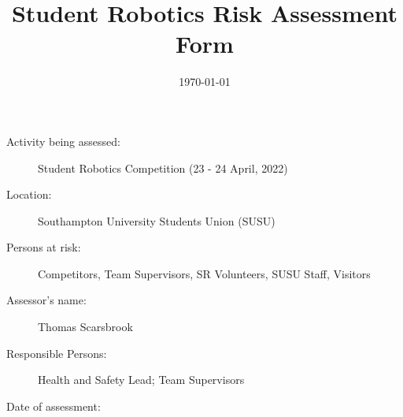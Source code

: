 \documentclass[12pt,a4paper]{scrartcl}
\title{Student Robotics Risk Assessment Form}
\begin{document}
\maketitle

\begin{description}
\item[Activity being assessed:] Student Robotics Competition (23 - 24 April, 2022)
\item[Location:] Southampton University Students Union (SUSU)
\item[Persons at risk:] Competitors, Team Supervisors, SR Volunteers, SUSU Staff, Visitors
\end{description}

\begin{description}
\item[Assessor's name:] Thomas Scarsbrook
\item[Responsible Persons:] Health and Safety Lead; Team Supervisors
\item[Date of assessment:] \date{\today}
\end{description}
\clearpage

\newcommand{\risk}[4]{
	#1 & #2 & #3 & #4 \\
}
\end{document}
